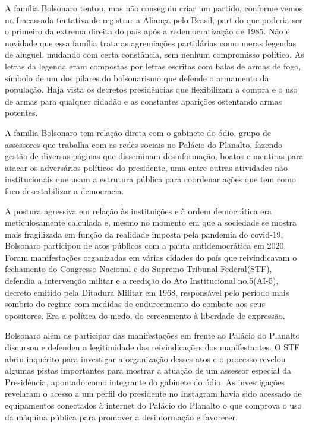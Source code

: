 A família Bolsonaro tentou, mas não conseguiu criar um partido, conforme
vemos na fracassada tentativa de registrar a Aliança pelo Brasil,
partido que poderia ser o primeiro da extrema direita do país após a
redemocratização de 1985. Não é novidade que essa família trata as
agremiações partidárias como meras legendas de aluguel, mudando com
certa constância, sem nenhum compromisso político. As letras da legenda
eram compostas por letras escritas com balas de armas de fogo, símbolo
de um dos pilares do bolsonarismo que defende o armamento da população.
Haja vista os decretos presidências que flexibilizam a compra e o uso de
armas para qualquer cidadão e as constantes aparições ostentando armas
potentes.

A família Bolsonaro tem relação direta com o gabinete do ódio, grupo de
assessores que trabalha com as redes sociais no Palácio do Planalto,
fazendo gestão de diversas páginas que disseminam desinformação, boatos
e mentiras para atacar os adversários políticos do presidente, uma entre
outras atividades não institucionais que usam a estrutura pública para
coordenar ações que tem como foco desestabilizar a democracia.

A postura agressiva em relação às instituições e à ordem democrática era
meticulosamente calculada e, mesmo no momento em que a sociedade se
mostra mais fragilizada em função da realidade imposta pela pandemia do
covid-19, Bolsonaro participou de atos públicos com a pauta
antidemocrática em 2020. Foram manifestações organizadas em várias
cidades do país que reivindicavam o fechamento do Congresso Nacional e
do Supremo Tribunal Federal(STF), defendia a intervenção militar e a
reedição do Ato Institucional no.5(AI-5), decreto emitido pela Ditadura
Militar em 1968, responsável pelo período mais sombrio do regime com
medidas de endurecimento do combate aos seus opositores. Era a política
do medo, do cerceamento à liberdade de expressão.

Bolsonaro além de participar das manifestações em frente ao Palácio do
Planalto discursou e defendeu a legitimidade das reivindicações dos
manifestantes. O STF abriu inquérito para investigar a organização
desses atos e o processo revelou algumas pistas importantes para mostrar
a atuação de um assessor especial da Presidência, apontado como
integrante do gabinete do ódio. As investigações revelaram o acesso a um
perfil do presidente no Instagram havia sido acessado de equipamentos
conectados à internet do Palácio do Planalto o que comprova o uso da
máquina pública para promover a desinformação e favorecer.

